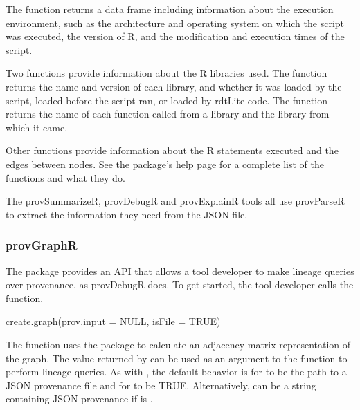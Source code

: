 The  function returns a data frame including information about the execution environment, such as the architecture and operating system on which the script was executed, the version of R, and the modification and execution times of the script.

Two functions provide information about the R libraries used.  The  function returns the name and version of each library, and whether it was loaded by the script, loaded before the script ran, or loaded by rdtLite code.  The  function returns the name of each function called from a library and the library from which it came.

Other functions provide information about the R statements executed and the edges between nodes.  See the package's help page for a complete list of the functions and what they do.

The provSummarizeR, provDebugR and provExplainR tools all use provParseR to extract the information they need from the JSON file.


\subsubsection{provGraphR}

The  package provides an API that allows a tool developer to make lineage queries over provenance, as provDebugR does.  To get started, the tool developer calls the  function.
\begin{example}
create.graph(prov.input = NULL, isFile = TRUE)
\end{example}

%

The  function uses the   package to calculate an adjacency matrix representation of the graph.  The value returned by  can be used as an argument to the  function to perform lineage queries. As with , the default behavior is for  to be the path to a JSON provenance file and for  to be TRUE.  Alternatively,  can be a string containing JSON provenance if  is .


